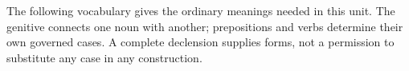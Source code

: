 The following vocabulary gives the ordinary meanings needed in this unit. The genitive connects one noun with another; prepositions and verbs determine their own governed cases. A complete declension supplies forms, not a permission to substitute any case in any construction.

\par\begingroup
\fontsize{10.5}{13.2}\selectfont
\setlength{\LTleft}{0pt}\setlength{\LTright}{\fill}

